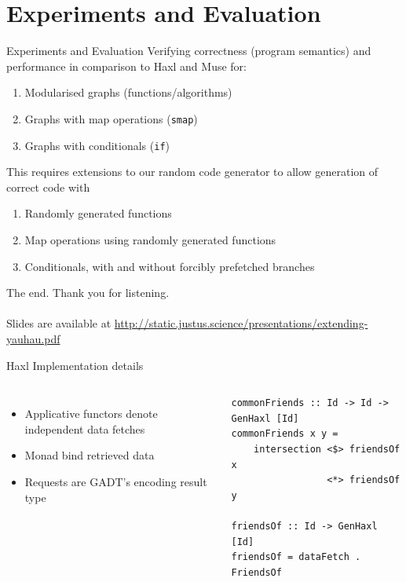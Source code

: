 \documentclass[utf8x,10pt,aspectratio=169]{beamer}
\begin{document}
\section{Experiments and Evaluation}

\begin{frame}{Experiments and Evaluation}
	Verifying correctness (program semantics) and performance in comparison to Haxl and Muse for:
	
	\pause
	
	\begin{enumerate}
		\item Modularised graphs (functions/algorithms)
		\item Graphs with map operations (\texttt{smap})
		\item Graphs with conditionals (\texttt{if})
	\end{enumerate}
	
	\pause
	
	This requires extensions to our random code generator to allow generation of correct code with
	
	\pause
	
	\begin{enumerate}
		\item Randomly generated functions
		\item Map operations using randomly generated functions
		\item Conditionals, with and without forcibly prefetched branches
	\end{enumerate}
	
\end{frame}

\begin{frame}
	The end. Thank you for listening. \\ \\
	Slides are available at \href{http://static.justus.science/presentations/extending-yauhau.pdf}{http://static.justus.science/presentations/extending-yauhau.pdf}
\end{frame}

\appendix

\begin{frame}[fragile]{Haxl Implementation details}

	\begin{columns}
	
		\begin{itemize}
			\item Applicative functors denote independent data fetches
			\item Monad bind retrieved data
			\item Requests are GADT's encoding result type
		\end{itemize}
		\begin{verbatim}
commonFriends :: Id -> Id -> GenHaxl [Id]
commonFriends x y = 
    intersection <$> friendsOf x 
                 <*> friendsOf y

friendsOf :: Id -> GenHaxl [Id]
friendsOf = dataFetch . FriendsOf
		\end{verbatim}		
	\end{columns}
	
\end{frame}
\end{document}
